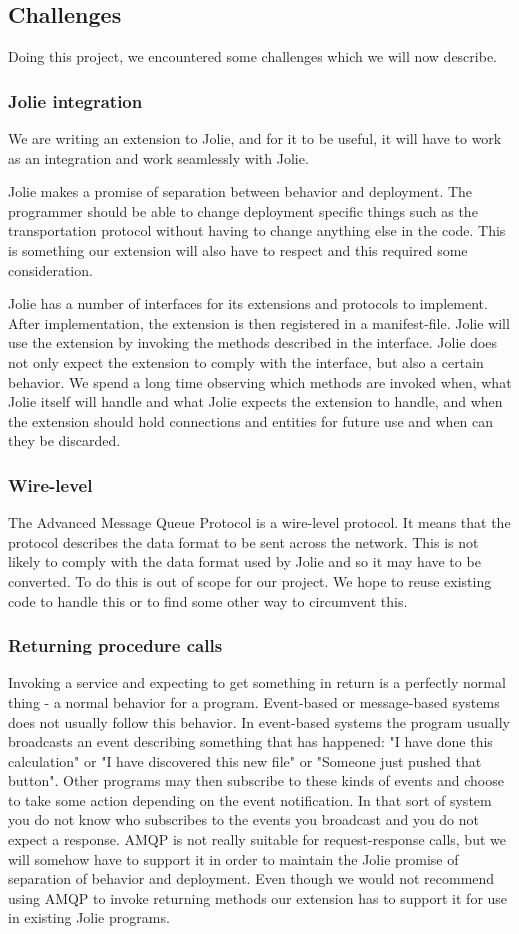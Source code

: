 \subsection{Challenges}
Doing this project, we encountered some challenges which we will now describe.
\subsubsection{Jolie integration}
\label{subsubsec:Jolie integration}
We are writing an extension to Jolie, and for it to be useful, it will have to work as an integration and work seamlessly with Jolie.

Jolie makes a promise of separation between behavior and deployment. The programmer should be able to change deployment specific things such as the transportation protocol without having to change anything else in the code. This is something our extension will also have to respect and this required some consideration.

Jolie has a number of interfaces for its extensions and protocols to implement. After implementation, the extension is then registered in a manifest-file. Jolie will use the extension by invoking the methods described in the interface. Jolie does not only expect the extension to comply with the interface, but also a certain behavior. We spend a long time observing which methods are invoked when, what Jolie itself will handle and what Jolie expects the extension to handle, and when the extension should hold connections and entities for future use and when can they be discarded.
\subsubsection{Wire-level}
The Advanced Message Queue Protocol is a wire-level protocol. It means that the protocol describes the data format to be sent across the network. This is not likely to comply with the data format used by Jolie and so it may have to be converted. To do this is out of scope for our project. We hope to reuse existing code to handle this or to find some other way to circumvent this.
\subsubsection{Returning procedure calls}
Invoking a service and expecting to get something in return is a perfectly normal thing - a normal behavior for a program. Event-based or message-based systems does not usually follow this behavior. In event-based systems the program usually broadcasts an event describing something that has happened: "I have done this calculation" or "I have discovered this new file" or "Someone just pushed that button". Other programs may then subscribe to these kinds of events and choose to take some action depending on the event notification. In that sort of system you do not know who subscribes to the events you broadcast and you do not expect a response. AMQP is not really suitable for request-response calls, but we will somehow have to support it in order to maintain the Jolie promise of separation of behavior and deployment. Even though we would not recommend using AMQP to invoke returning methods our extension has to support it for use in existing Jolie programs.
